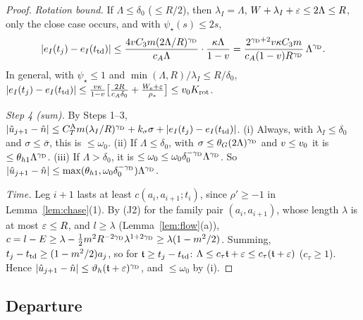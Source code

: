 \begin{proof}
\emph{Rotation bound.} If $\Lambda\le\delta_0$ ($\le R/2$), then $\lambda_I=\Lambda$, $W+\lambda_I+\varepsilon\le2\Lambda\le R$, only the
close case occurs, and with $\psi_\star(s)\le2s$,
\[
|e_I(t_j)-e_I(t_{\mathrm{td}})|\le\frac{4vC_3m(2\Lambda/R)^{\gamma_{\mathrm D}}}{c_A\Lambda}\cdot\frac{\kappa\Lambda}{1-v}
=\frac{2^{\gamma_{\mathrm D}+2}v\kappa C_3m}{c_A(1-v)R^{\gamma_{\mathrm D}}}\,\Lambda^{\gamma_{\mathrm D}}.
\]
In general, with $\psi_\star\le1$ and $\min(\Lambda,R)/\lambda_I\le R/\delta_0$,
$|e_I(t_j)-e_I(t_{\mathrm{td}})|\le\frac{v\kappa}{1-v}\bigl[\frac{2R}{c_A\delta_0}+\frac{W_{\mathrm e}+\varepsilon}{\rho_*}\bigr]\le v_0 K_{\mathrm{rot}}$.

\emph{Step 4 (sum).} By Steps 1--3, $|\hat u_{j+1}-\hat n|\le C_T^{\mathrm A}m(\lambda_I/R)^{\gamma_{\mathrm D}}+k_\sigma\sigma+|e_I(t_j)-e_I(t_{\mathrm{td}})|$.
(i) Always, with $\lambda_I\le\delta_0$ and $\sigma\le\bar\sigma$, this is $\le\omega_0$. (ii) If $\Lambda\le\delta_0$, with
$\sigma\le\theta_G(2\Lambda)^{\gamma_{\mathrm D}}$ and $v\le v_0$ it is $\le\theta_{h1}\Lambda^{\gamma_{\mathrm D}}$. (iii) If $\Lambda>\delta_0$, it is
$\le\omega_0\le\omega_0\delta_0^{-\gamma_{\mathrm D}}\Lambda^{\gamma_{\mathrm D}}$. So $|\hat u_{j+1}-\hat n|\le\max(\theta_{h1},\omega_0\delta_0^{-\gamma_{\mathrm D}})\Lambda^{\gamma_{\mathrm D}}$.

\emph{Time.} Leg $i+1$ lasts at least $c(a_i,a_{i+1};t_i)$, since $\rho'\ge-1$ in Lemma~\ref{lem:chase}(1). By (J2) for the family pair
$(a_i,a_{i+1})$, whose length $\lambda$ is at most $\varepsilon\le R$, and $l\ge\lambda$ (Lemma~\ref{lem:flow}(a)),
$c=l-E\ge\lambda-\frac12m^2R^{-2\gamma_{\mathrm D}}\lambda^{1+2\gamma_{\mathrm D}}\ge\lambda(1-m^2/2)$. Summing, $t_j-t_{\mathrm{td}}\ge(1-m^2/2)a_j$, so for
$\mathfrak t\ge t_j-t_{\mathrm{td}}$: $\Lambda\le c_\tau\mathfrak t+\varepsilon\le c_\tau(\mathfrak t+\varepsilon)$ ($c_\tau\ge1$). Hence
$|\hat u_{j+1}-\hat n|\le\vartheta_h(\mathfrak t+\varepsilon)^{\gamma_{\mathrm D}}$, and $\le\omega_0$ by (i).
\end{proof}

\subsection{Departure}

